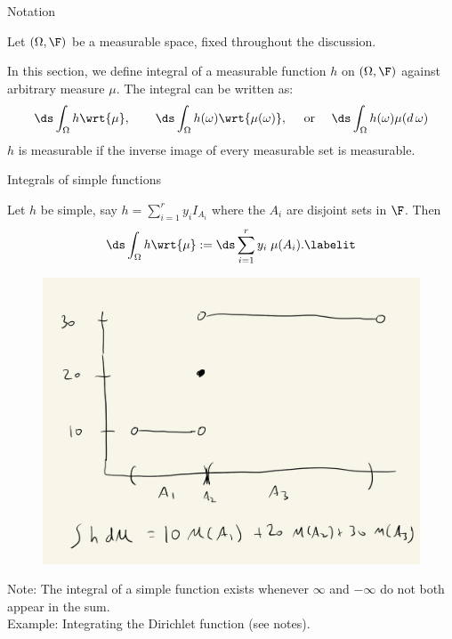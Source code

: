\documentclass[10pt]{beamer}
\begin{document}
\begin{frame}{Notation}

Let $(\Omega, \F)$ be a measurable space, fixed throughout the discussion.

In this section, we define integral of a measurable function $h$ on $(\Omega, \F)$ against arbitrary measure $\mu$.  The integral can be written as:
\[ \ds\int_{\Omega} h \wrt{\mu}, \quad \quad \ds\int_{\Omega} h(\omega) \wrt{\mu(\omega)}, \quad \text{ or } \quad \ds\int_{\Omega} h(\omega) \mu(d \, \omega) \]
\vfill
{\tiny $h$ is measurable if the inverse image of every measurable set is measurable.}
\end{frame}
 
 

\begin{frame}{Integrals of simple functions}

\begin{definition}
Let $h$ be simple, say $h = \sum_{i=1}^r y_i I_{A_i}$ where the $A_i$ are disjoint sets in $\F$.  Then
\begin{align*}
\ds\int_{\Omega} h \wrt{\mu} := \ds\sum_{i=1}^r y_i \; \mu(A_i).
\labelit \label{eqn:integral_of_simple_function}	
\end{align*}
 \label{def:integral_of_simple_function}
\end{definition}

\begin{figure}[H]
\centering 
\includegraphics[width=.4\textwidth]{images/integral_of_simple_function}	
\end{figure}	

{\tiny Note: The integral of a simple function exists whenever $\infty$ and  $-\infty$ do not both appear in the sum. } \\
{\tiny Example: Integrating the Dirichlet function (see notes).} 
\end{frame}
\end{document}
